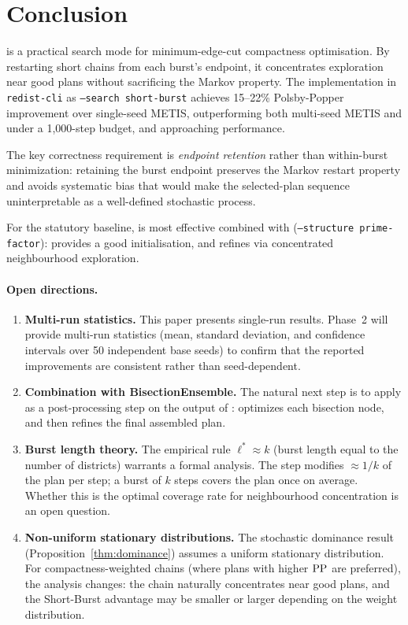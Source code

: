 \section{Conclusion}
\label{sec:conclusion}

\shb{} is a practical search mode for minimum-edge-cut compactness
optimisation.
By restarting short \recom{} chains from each burst's endpoint, it
concentrates exploration near good plans without sacrificing the
Markov property.
The implementation in \texttt{redist-cli} as \texttt{--search short-burst}
achieves 15--22\% Polsby-Popper improvement over single-seed METIS,
outperforming both multi-seed METIS and \cs{} under a 1{,}000-step
budget, and approaching \be{} performance.

The key correctness requirement is \emph{endpoint retention} rather
than within-burst minimization: retaining the burst endpoint
preserves the Markov restart property and avoids systematic bias
that would make the selected-plan sequence uninterpretable as a
well-defined stochastic process.

For the statutory baseline, \shb{} is most effective combined with
\ar{} (\texttt{--structure prime-factor}): \ar{} provides a good
initialisation, and \shb{} refines via concentrated neighbourhood
exploration.

\paragraph{Open directions.}

\begin{enumerate}
\item \textbf{Multi-run statistics.}
      This paper presents single-run results.
      Phase~2 will provide multi-run statistics (mean, standard deviation,
      and confidence intervals over 50 independent base seeds) to confirm
      that the reported improvements are consistent rather than
      seed-dependent.

\item \textbf{Combination with BisectionEnsemble.}
      The natural next step is to apply \shb{} as a post-processing
      step on the output of \be{}: \be{} optimizes each bisection node,
      and \shb{} then refines the final assembled plan.

\item \textbf{Burst length theory.}
      The empirical rule $\ell^* \approx k$ (burst length equal to
      the number of districts) warrants a formal analysis.
      The \recom{} step modifies $\approx 1/k$ of the plan per step;
      a burst of $k$ steps covers the plan once on average.
      Whether this is the optimal coverage rate for neighbourhood
      concentration is an open question.

\item \textbf{Non-uniform stationary distributions.}
      The stochastic dominance result (Proposition~\ref{thm:dominance})
      assumes a uniform stationary distribution.
      For compactness-weighted chains (where plans with higher $\mathrm{PP}$
      are preferred), the analysis changes: the chain naturally
      concentrates near good plans, and the Short-Burst advantage
      may be smaller or larger depending on the weight distribution.
\end{enumerate}
